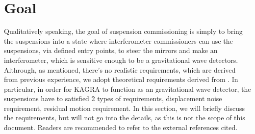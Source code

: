 \section{Goal \label{sec:goal}}
Qualitatively speaking, the goal of suspension commissioning is simply to bring the suspensions into a state where interferometer commissioners can use the suspensions, via defined entry points, to steer the mirrors and make an interferometer, which is sensitive enough to be a gravitational wave detectors.
Althrough, as mentioned, there's no realistic requirements, which are derived from previous experience, we adopt theoretical requirements derived from \cite{Sekiguchi:2016bmv}. In particular, in order for KAGRA to function as an gravitational wave detector, the suspensions have to satisfied 2 types of requirements, displacement noise requirement, residual motion requirement.
In this section, we will briefly discuss the requirements, but will not go into the details, as this is not the scope of this document.
Readers are recommended to refer to the external references cited.

